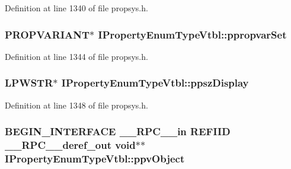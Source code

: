 Definition at line 1340 of file propsys.\+h.

\subsubsection[{\texorpdfstring{ppropvar\+Set}{ppropvarSet}}]{ {\bf P\+R\+O\+P\+V\+A\+R\+I\+A\+NT}$\ast$ I\+Property\+Enum\+Type\+Vtbl\+::ppropvar\+Set}\hypertarget{struct_i_property_enum_type_vtbl_afae84f821057d2ae04ad25407cb0304b}{}\label{struct_i_property_enum_type_vtbl_afae84f821057d2ae04ad25407cb0304b}


Definition at line 1344 of file propsys.\+h.

\subsubsection[{\texorpdfstring{ppsz\+Display}{ppszDisplay}}]{ {\bf L\+P\+W\+S\+TR}$\ast$ I\+Property\+Enum\+Type\+Vtbl\+::ppsz\+Display}\hypertarget{struct_i_property_enum_type_vtbl_a519a7aa86bc34b57680a90b61429b9d4}{}\label{struct_i_property_enum_type_vtbl_a519a7aa86bc34b57680a90b61429b9d4}


Definition at line 1348 of file propsys.\+h.

\subsubsection[{\texorpdfstring{ppv\+Object}{ppvObject}}]{\setlength{\rightskip}{0pt plus 5cm}B\+E\+G\+I\+N\+\_\+\+I\+N\+T\+E\+R\+F\+A\+CE {\bf \+\_\+\+\_\+\+R\+P\+C\+\_\+\+\_\+in} {\bf R\+E\+F\+I\+ID} {\bf \+\_\+\+\_\+\+R\+P\+C\+\_\+\+\_\+deref\+\_\+out} {\bf void}$\ast$$\ast$ I\+Property\+Enum\+Type\+Vtbl\+::ppv\+Object}\hypertarget{struct_i_property_enum_type_vtbl_ad48b0f69d4b782eca21373bda4a69626}{}\label{struct_i_property_enum_type_vtbl_ad48b0f69d4b782eca21373bda4a69626}


